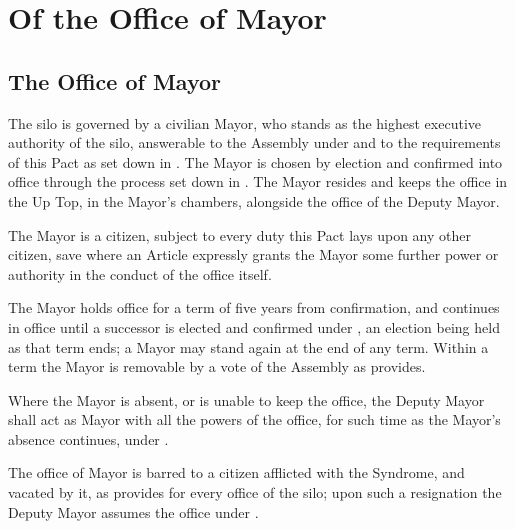 \chapter{Of the Office of Mayor}
\label{art:mayor}


\section{The Office of Mayor}
\label{sec:mayor:office-of-mayor}

The silo is governed by a civilian Mayor, who stands as the highest executive authority of the silo, answerable to the Assembly under  and to the requirements of this Pact as set down in . The Mayor is chosen by election and confirmed into office through the process set down in . The Mayor resides and keeps the office in the Up Top, in the Mayor's chambers, alongside the office of the Deputy Mayor.

\begin{clauses}
\item The Mayor is a citizen, subject to every duty this Pact lays upon any other citizen, save where an Article expressly grants the Mayor some further power or authority in the conduct of the office itself.
\item The Mayor holds office for a term of five years from confirmation, and continues in office until a successor is elected and confirmed under , an election being held as that term ends; a Mayor may stand again at the end of any term. Within a term the Mayor is removable by a vote of the Assembly as  provides.
\item Where the Mayor is absent, or is unable to keep the office, the Deputy Mayor shall act as Mayor with all the powers of the office, for such time as the Mayor's absence continues, under .
\item The office of Mayor is barred to a citizen afflicted with the Syndrome, and vacated by it, as  provides for every office of the silo; upon such a resignation the Deputy Mayor assumes the office under .
\end{clauses}

